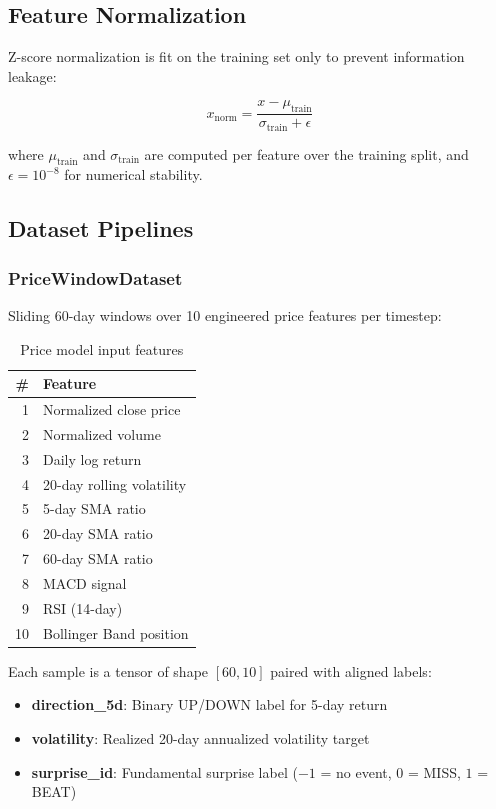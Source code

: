 \documentclass[12pt,a4paper]{article}
\begin{document}
\subsection{Feature Normalization}

Z-score normalization is fit on the training set only to prevent information leakage:

\begin{equation}
x_{\text{norm}} = \frac{x - \mu_{\text{train}}}{\sigma_{\text{train}} + \epsilon}
\end{equation}

where $\mu_{\text{train}}$ and $\sigma_{\text{train}}$ are computed per feature over the training split, and $\epsilon = 10^{-8}$ for numerical stability.

\subsection{Dataset Pipelines}

\subsubsection{PriceWindowDataset}

Sliding 60-day windows over 10 engineered price features per timestep:

\begin{table}[H]
\centering
\begin{tabular}{rl}
\toprule
\textbf{\#} & \textbf{Feature} \\
\midrule
1 & Normalized close price \\
2 & Normalized volume \\
3 & Daily log return \\
4 & 20-day rolling volatility \\
5 & 5-day SMA ratio \\
6 & 20-day SMA ratio \\
7 & 60-day SMA ratio \\
8 & MACD signal \\
9 & RSI (14-day) \\
10 & Bollinger Band position \\
\bottomrule
\end{tabular}
\caption{Price model input features}
\label{tab:price_features}
\end{table}

Each sample is a tensor of shape $[60, 10]$ paired with aligned labels:
\begin{itemize}[noitemsep]
    \item \textbf{direction\_5d}: Binary UP/DOWN label for 5-day return
    \item \textbf{volatility}: Realized 20-day annualized volatility target
    \item \textbf{surprise\_id}: Fundamental surprise label ($-1$ = no event, $0$ = MISS, $1$ = BEAT)
\end{itemize}
\end{document}
